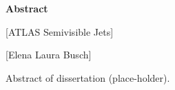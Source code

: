 
\begin{titlepage}
\begin{center}

\vspace*{5\baselineskip}
\textbf{\large Abstract}

[ATLAS Semivisible Jets]

[Elena Laura Busch]
\end{center}
\begin{flushleft}
\hspace{10mm}Abstract of dissertation (place-holder).

\end{flushleft}
\vspace*{\fill}
\end{titlepage}
